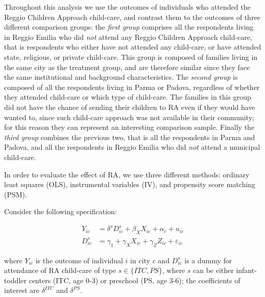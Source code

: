 \documentclass[12pt]{article}
\begin{document}
Throughout this analysis we use the outcomes of individuals who attended the Reggio Children Approach child-care, and contrast them to the outcomes of three different comparison groups:
the \textit{first group} comprises all the respondents living in Reggio Emilia who did \textit{not} attend any Reggio Children Approach child-care, that is respondents who either have not attended any child-care, or have attended state, religious, or private child-care. This group is composed of families living in the same city as the treatment group, and are therefore similar since they face the same institutional and background characteristics.
The \textit{second group} is composed of all the respondents living in Parma or Padova, regardless of whether they attended child-care or which type of child-care. The families in this group did not have the chance of sending their children to RA even if they would have wanted to, since such child-care approach was not available in their community; for this reason they can represent an interesting comparison sample.
Finally the \textit{third group} combines the previous two, that is all the respondents in Parma and Padova, and all the respondents in Reggio Emilia who did \textit{not} attend a municipal child-care.

In order to evaluate the effect of RA, we use three different methods: ordinary least squares (OLS), instrumental variables (IV), and propensity score matching (PSM).

Consider the following specification:

\begin{align}
Y_{ic} & = \delta^{s} D^{s}_{ic} + \beta_{X}X_{ic} + \alpha_{c} +  u_{ic} \label{eq:secondstage} \\ 
D^{s}_{ic} & = \gamma_1 + \gamma_{X}X_{ic} + \gamma_{Z}Z_{ic} + \varepsilon_{ic} \label{eq:firststage}
\end{align}

where $Y_{ic}$ is the outcome of individual $i$ in city $c$ and $D^{s}_{ic}$ is a dummy for attendance of RA child-care of type $s \in \{ITC,PS\}$, where $s$ can be either infant-toddler centers (ITC, age 0-3) or preschool (PS, age 3-6); the coefficients of interest are $\delta^{ITC}$ and $\delta^{PS}$. 
\end{document}
